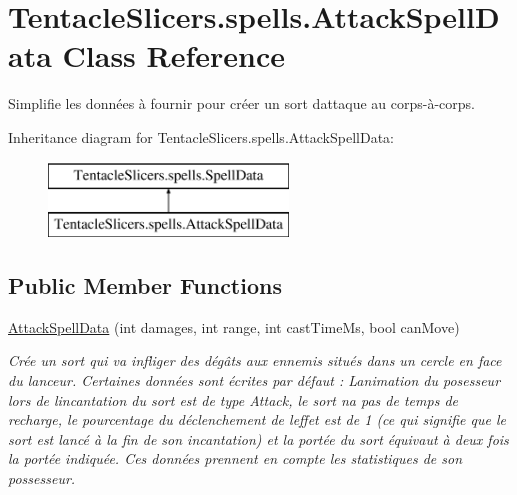 \hypertarget{class_tentacle_slicers_1_1spells_1_1_attack_spell_data}{}\section{Tentacle\+Slicers.\+spells.\+Attack\+Spell\+Data Class Reference}
\label{class_tentacle_slicers_1_1spells_1_1_attack_spell_data}


Simplifie les données à fournir pour créer un sort d\textquotesingle{}attaque au corps-\/à-\/corps.  


Inheritance diagram for Tentacle\+Slicers.\+spells.\+Attack\+Spell\+Data\+:\begin{figure}[H]
\begin{center}
\leavevmode
\includegraphics[height=2.000000cm]{class_tentacle_slicers_1_1spells_1_1_attack_spell_data}
\end{center}
\end{figure}
\subsection*{Public Member Functions}
\begin{DoxyCompactItemize}
\item 
\hyperlink{class_tentacle_slicers_1_1spells_1_1_attack_spell_data_a0e2f1e32eda39e61b4c093d8792928db}{Attack\+Spell\+Data} (int damages, int range, int cast\+Time\+Ms, bool can\+Move)
\begin{DoxyCompactList}\small\item\em Crée un sort qui va infliger des dégâts aux ennemis situés dans un cercle en face du lanceur. Certaines données sont écrites par défaut \+: L\textquotesingle{}animation du posesseur lors de l\textquotesingle{}incantation du sort est de type Attack, le sort n\textquotesingle{}a pas de temps de recharge, le pourcentage du déclenchement de l\textquotesingle{}effet est de 1 (ce qui signifie que le sort est lancé à la fin de son incantation) et la portée du sort équivaut à deux fois la portée indiquée. Ces données prennent en compte les statistiques de son possesseur. \end{DoxyCompactList}\end{DoxyCompactItemize}
